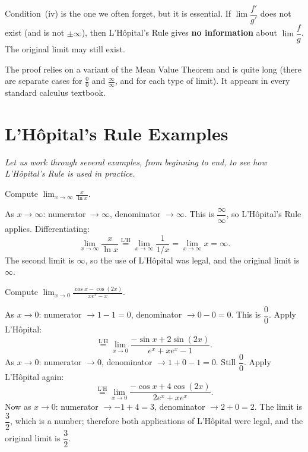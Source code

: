 \begin{remark}
Condition~(iv) is the one we often forget, but it is essential.  If $\lim \dfrac{f'}{g'}$ does not exist (and is not $\pm\infty$), then L'H\^opital's Rule gives \textbf{no information} about $\lim\dfrac{f}{g}$.  The original limit may still exist.
\end{remark}

\begin{remark}
The proof relies on a variant of the Mean Value Theorem and is quite long (there are separate cases for $\frac{0}{0}$ and $\frac{\infty}{\infty}$, and for each type of limit).  It appears in every standard calculus textbook.
\end{remark}

\section{L'H\^opital's Rule Examples}
\label{sec:6.7}

\textit{Let us work through several examples, from beginning to end, to see how L'H\^opital's Rule is used in practice.}

\begin{example}
\label{ex:6-6}
Compute $\displaystyle\lim_{x \to \infty}\frac{x}{\ln x}$.

As $x \to \infty$: numerator $\to \infty$, denominator $\to \infty$.  This is $\dfrac{\infty}{\infty}$, so L'H\^opital's Rule applies.  Differentiating:
\[
  \lim_{x \to \infty}\frac{x}{\ln x} \stackrel{\text{L'H}}{=} \lim_{x \to \infty}\frac{1}{1/x} = \lim_{x \to \infty} x = \infty.
\]
The second limit is $\infty$, so the use of L'H\^opital was legal, and the original limit is $\infty$.
\end{example}

\begin{example}
\label{ex:6-7}
Compute $\displaystyle\lim_{x \to 0}\frac{\cos x - \cos(2x)}{xe^{x} - x}$.

As $x \to 0$: numerator $\to 1 - 1 = 0$, denominator $\to 0 - 0 = 0$.  This is $\dfrac{0}{0}$.  Apply L'H\^opital:
\[
  \stackrel{\text{L'H}}{=} \lim_{x \to 0}\frac{-\sin x + 2\sin(2x)}{e^{x} + xe^{x} - 1}.
\]
As $x \to 0$: numerator $\to 0$, denominator $\to 1 + 0 - 1 = 0$.  Still $\dfrac{0}{0}$.  Apply L'H\^opital again:
\[
  \stackrel{\text{L'H}}{=} \lim_{x \to 0}\frac{-\cos x + 4\cos(2x)}{2e^{x} + xe^{x}}.
\]
Now as $x \to 0$: numerator $\to -1 + 4 = 3$, denominator $\to 2 + 0 = 2$.  The limit is $\dfrac{3}{2}$, which is a number; therefore both applications of L'H\^opital were legal, and the original limit is $\dfrac{3}{2}$.
\end{example}

